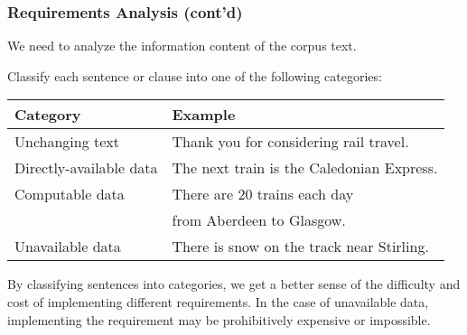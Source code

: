 \begin{frame}
\frametitle{Requirements Analysis (cont'd)}

We need to analyze the information content of the corpus text.

Classify each sentence or clause into one of the following categories:

\vspace{12pt}

\begin{center}
\begin{tabular}{|l|l|}
\hline
\textbf{Category} & \textbf{Example} \\
\hline
Unchanging text & Thank you for considering rail travel. \\
\hline
Directly-available data & The next train is the Caledonian Express. \\
\hline
Computable data & There are 20 trains each day \\
 & from Aberdeen to Glasgow. \\
\hline
Unavailable data & There is snow on the track near Stirling. \\
\hline
\end{tabular}
\end{center}

\vspace{12pt}

By classifying sentences into categories, we get a better sense
of the difficulty and cost of implementing different requirements.
In the case of unavailable data, implementing the requirement
may be prohibitively expensive or impossible.

\end{frame}

